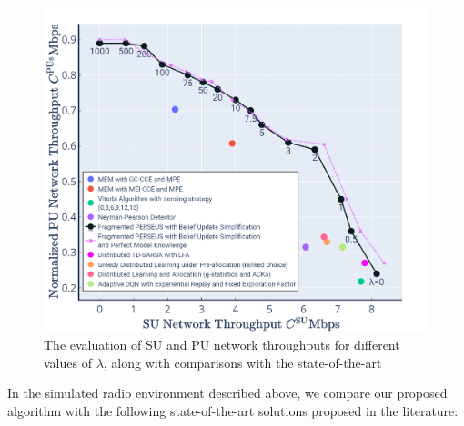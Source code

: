 \documentclass[12pt, draftcls, onecolumn]{IEEEtran}
\begin{document}
\begin{figure} [htb]
    \centerline{
    \includegraphics[width = 0.8\linewidth]{Throughput_and_Interference_with_DQN.png}}
    \caption{The evaluation of SU and PU network throughputs for different values of $\lambda$, along with comparisons with the state-of-the-art}
    \label{Fig. 4}
\end{figure}
In the simulated radio environment described above, we compare our proposed algorithm with the following state-of-the-art solutions proposed in the literature:
\end{document}
